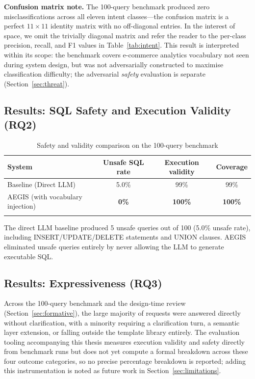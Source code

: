 \documentclass[11pt]{article}
\begin{document}
\noindent\textbf{Confusion matrix note.} The 100-query benchmark produced zero misclassifications across all eleven intent classes---the confusion matrix is a perfect $11{\times}11$ identity matrix with no off-diagonal entries. In the interest of space, we omit the trivially diagonal matrix and refer the reader to the per-class precision, recall, and F1 values in Table~\ref{tab:intent}. This result is interpreted within its scope: the benchmark covers e-commerce analytics vocabulary not seen during system design, but was not adversarially constructed to maximise classification difficulty; the adversarial \emph{safety} evaluation is separate (Section~\ref{sec:threat}).

\subsection{Results: SQL Safety and Execution Validity (RQ2)}
\begin{longtable}{lccc}
\toprule
\textbf{System} & \textbf{Unsafe SQL rate} & \textbf{Execution validity} & \textbf{Coverage}\\
\midrule
Baseline (Direct LLM) & 5.0\% & 99\% & 99\%\\
AEGIS (with vocabulary injection) & \textbf{0\%} & \textbf{100\%} & \textbf{100\%}\\
\bottomrule
\caption{Safety and validity comparison on the 100-query benchmark}\label{tab:safety}
\end{longtable}

The direct LLM baseline produced 5 unsafe queries out of 100 (5.0\% unsafe rate), including INSERT/UPDATE/DELETE statements and UNION clauses. AEGIS eliminated unsafe queries entirely by never allowing the LLM to generate executable SQL.

\subsection{Results: Expressiveness (RQ3)\label{sec:expressiveness}}
Across the 100-query benchmark and the design-time review (Section~\ref{sec:formative}), the large majority of requests were answered directly without clarification, with a minority requiring a clarification turn, a semantic layer extension, or falling outside the template library entirely. The evaluation tooling accompanying this thesis measures execution validity and safety directly from benchmark runs but does not yet compute a formal breakdown across these four outcome categories, so no precise percentage breakdown is reported; adding this instrumentation is noted as future work in Section~\ref{sec:limitations}.
\end{document}
